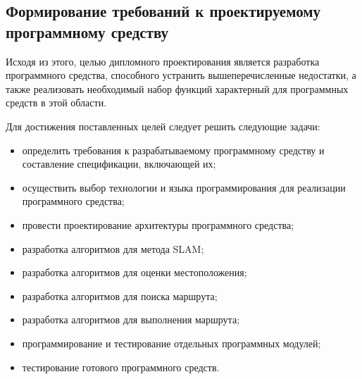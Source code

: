 \subsection{Формирование требований к проектируемому программному средству}

%


Исходя из этого, целью дипломного проектирования является разработка
программного средства, способного устранить вышеперечисленные недостатки, а
также реализовать необходимый набор функций характерный для программных средств
в этой области.

Для достижения поставленных целей следует решить следующие задачи: 
\begin{itemize}
	\item определить требования  к  разрабатываемому  программному  средству  и 
	составление спецификации, включающей их; 
	\item осуществить выбор  технологии  и  языка  программирования  для
		реализации программного средства; 
	\item провести проектирование архитектуры программного средства; 
	\item разработка алгоритмов для метода SLAM; 
	\item разработка алгоритмов для оценки местоположения; 
	\item разработка алгоритмов для поиска маршрута; 
	\item разработка алгоритмов для выполнения маршрута; 
	\item программирование и тестирование отдельных программных модулей; 
	\item тестирование готового программного средств.
\end{itemize}


%
%
